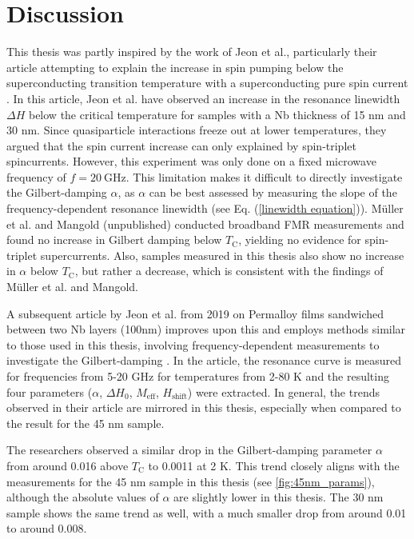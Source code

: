 \chapter{Discussion}
This thesis was partly inspired by the work of Jeon et al., particularly their article attempting to explain the increase in spin pumping below the superconducting transition temperature with a superconducting pure spin current \cite{Jeon2018}. In this article, Jeon et al. have observed an increase in the resonance linewidth $\Delta H$ below the critical temperature for samples with a Nb thickness of 15 nm and 30 nm. Since quasiparticle interactions freeze out at lower temperatures, they argued that the spin current increase can only explained by spin-triplet spincurrents. However, this experiment was only done on a fixed microwave frequency of $f = 20 \ \textrm{GHz}$. This limitation makes it difficult to directly investigate the Gilbert-damping $\alpha$, as $\alpha$ can be best assessed by measuring the slope of the frequency-dependent resonance linewidth (see Eq. (\ref{linewidth equation})). Müller et al. \cite{PhysRevLett.126.087201} and Mangold (unpublished) conducted broadband FMR measurements and found no increase in Gilbert damping below $T_\textrm{C}$, yielding no evidence for spin-triplet supercurrents. Also, samples measured in this thesis also show no increase in $\alpha$ below $T_\textrm{C}$, but rather a decrease, which is consistent with the findings of Müller et al. and Mangold.

A subsequent article by Jeon et al. from 2019 on Permalloy films sandwiched between two Nb layers (100nm) improves upon this and employs methods similar to those used in this thesis, involving frequency-dependent measurements to investigate the Gilbert-damping \cite{Jeon2019}. In the article, the resonance curve is measured for frequencies from 5-20 GHz for temperatures from 2-80 K and the resulting four parameters ($\alpha$, $\Delta H_0$, $M_\textrm{eff}$, $H_\textrm{shift}$) were extracted. In general, the trends observed in their article are mirrored in this thesis, especially when compared to the result for the 45 nm sample.

The researchers observed a similar drop in the Gilbert-damping parameter $\alpha$ from around 0.016 above $T_\textrm{C}$ to 0.0011 at 2 K. This trend closely aligns with the measurements for the 45 nm sample in this thesis (see \ref{fig:45nm_params}), although the absolute values of $\alpha$ are slightly lower in this thesis. The 30 nm sample shows the same trend as well, with a much smaller drop from around 0.01 to around 0.008.

